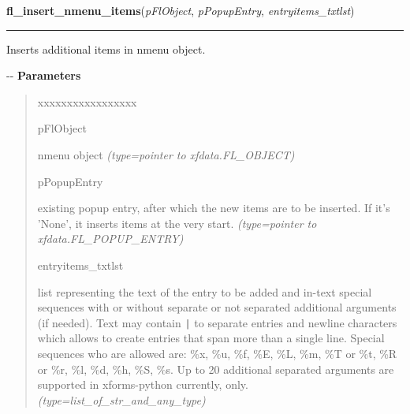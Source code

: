    \label{xformslib:flnmenu:fl_insert_nmenu_items}

    \vspace{0.5ex}

\hspace{.8\funcindent}\begin{boxedminipage}{\funcwidth}

    \raggedright \textbf{fl\_insert\_nmenu\_items}(\textit{pFlObject}, \textit{pPopupEntry}, \textit{entryitems\_txtlst})

    \vspace{-1.5ex}

    \rule{\textwidth}{0.5\fboxrule}
\setlength{\parskip}{2ex}

Inserts additional items in nmenu object.

-{}-
\setlength{\parskip}{1ex}
      \textbf{Parameters}
      \vspace{-1ex}

      \begin{quote}
        \begin{Ventry}{xxxxxxxxxxxxxxxxx}

          \item[pFlObject]


nmenu object
            {\it (type=pointer to xfdata.FL\_OBJECT)}

          \item[pPopupEntry]


existing popup entry, after which the new items are to be inserted.
If it's 'None', it inserts items at the very start.
            {\it (type=pointer to xfdata.FL\_POPUP\_ENTRY)}

          \item[entryitems\_txtlst]


list representing the text of the entry to be added and in-text
special sequences with or without separate or not separated additional
arguments (if needed). Text may contain \texttt{|} to separate entries and
newline characters which allows to create entries that span more than
a single line. Special sequences who are allowed are: \%x, \%u, \%f, \%E,
\%L, \%m, \%T or \%t, \%R or \%r, \%l, \%d, \%h, \%S, \%s. Up to 20 additional
separated arguments are supported in xforms-python currently, only.
            {\it (type=list\_of\_str\_and\_any\_type)}

        \end{Ventry}


\end{quote}
\end{boxedminipage}
